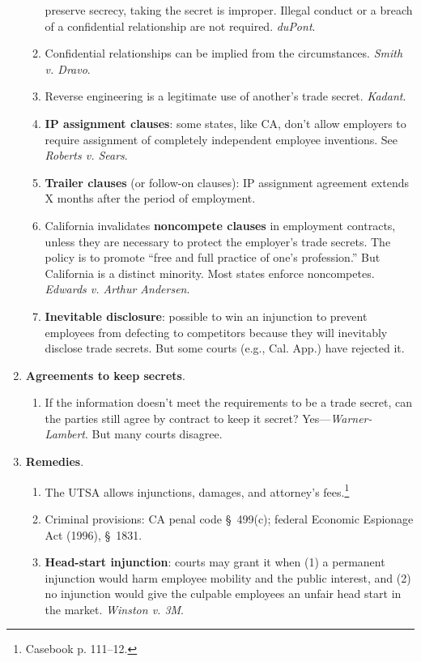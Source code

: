 \begin{enumerate}
\begin{enumerate}
        preserve secrecy, taking the secret is improper. Illegal conduct or a 
        breach of a confidential relationship are not required. \emph{duPont}.
        \item Confidential relationships can be implied from the 
        circumstances. \emph{Smith v. Dravo}.
        \item Reverse engineering is a legitimate use of another's trade 
        secret. \emph{Kadant}.
        \item \textbf{IP assignment clauses}: some states, like CA, don't 
        allow employers to require assignment of completely independent 
        employee inventions. See \emph{Roberts v. Sears}.
        \item \textbf{Trailer clauses} (or follow-on clauses): IP assignment 
        agreement extends X months after the period of employment.
        \item California invalidates \textbf{noncompete clauses} in employment 
        contracts, unless they are necessary to protect the employer's trade 
        secrets. The policy is to promote ``free and full practice of one's 
        profession.'' But California is a distinct minority. Most states 
        enforce noncompetes. \emph{Edwards v. Arthur Andersen}.
        \item \textbf{Inevitable disclosure}: possible to win an injunction to 
        prevent employees from defecting to competitors because they will 
        inevitably disclose trade secrets. But some courts (e.g., Cal. App.) 
        have rejected it.
    \end{enumerate}
    \item \textbf{Agreements to keep secrets}.
    \begin{enumerate}
        \item If the information doesn't meet the requirements to be a trade 
        secret, can the parties still agree by contract to keep it secret?  
        Yes---\emph{Warner-Lambert}. But many courts disagree.
    \end{enumerate}
    \item \textbf{Remedies}.
    \begin{enumerate}
        \item The UTSA allows injunctions, damages, and attorney's 
        fees.\footnote{Casebook p. 111--12.}
        \item Criminal provisions: CA penal code \S\ 499(c); federal Economic 
        Espionage Act (1996), \S\ 1831.
        \item \textbf{Head-start injunction}: courts may grant it when (1) a 
        permanent injunction would harm employee mobility and the public 
        interest, and (2) no injunction would give the culpable employees an 
        unfair head start in the market. \emph{Winston v. 3M}.
    \end{enumerate}
\end{enumerate}

